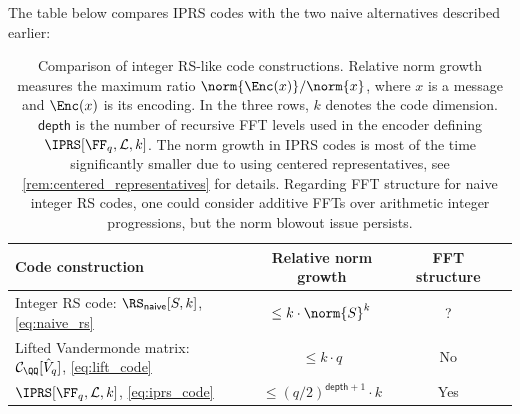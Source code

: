 



The table below compares IPRS codes with the two naive alternatives described earlier:

\begin{table}[H]
\centering
\begin{tabular}{lccc}
\toprule
Code construction &  Relative norm growth & FFT structure \\
\midrule
Integer RS code: $\RS_{\mathsf{naive}}[S,k]$, \eqref{eq:naive_rs} & $\leq k\cdot \norm{S}^k$ & ? \\
Lifted Vandermonde matrix: $\mathcal{C}_\QQ[\hat{V}_q]$,  \eqref{eq:lift_code} & $\leq k\cdot q$ & No \\
$\IPRS[\FF_q,\mathcal{L},k]$, \eqref{eq:iprs_code}  & $ \leq (q/2)^{\mathsf{depth}+1}\cdot k $ & Yes \\
\bottomrule
\end{tabular}
\caption{Comparison of integer RS-like code constructions. Relative norm growth measures the maximum ratio $\norm{\Enc(x)}/\norm{x}$, where $x$ is a message and $\Enc(x)$ is its encoding. In the three rows, $k$ denotes the code dimension.  $\mathsf{depth}$ is the number of recursive FFT levels used in the encoder defining $\IPRS[\FF_q,\mathcal{L},k]$. The norm growth in IPRS codes is most of the time significantly smaller due to using centered representatives, see \cref{rem:centered_representatives} for details. Regarding FFT structure for naive integer RS codes, one could consider additive FFTs over arithmetic integer progressions, but the norm blowout issue persists.}
\label{tab:code_comparison}
\end{table}

